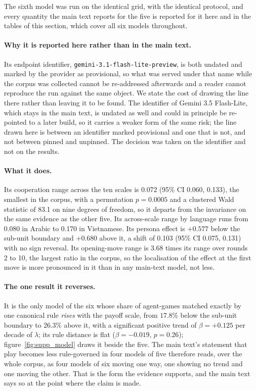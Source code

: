 \documentclass[openacc]{rsproca_new}
\newcommand{\lam}{\lambda}
\newcommand{\ci}[2]{(95\% CI #1, #2)}
\begin{document}
The sixth model was run on the identical grid, with the identical protocol, and
every quantity the main text reports for the five is reported for it here and
in the tables of this section, which cover all six models throughout.

\paragraph{Why it is reported here rather than in the main text.} Its endpoint
identifier, \texttt{gemini-3.1-flash-lite-preview}, is both undated and marked
by the provider as provisional, so what was served under that name while the
corpus was collected cannot be re-addressed afterwards and a reader cannot
reproduce the run against the same object. We state the cost of drawing the
line there rather than leaving it to be found. The identifier of Gemini 3.5
Flash-Lite, which stays in the main text, is undated as well and could in
principle be re-pointed to a later build, so it carries a weaker form of the
same risk; the line drawn here is between an identifier marked provisional and
one that is not, and not between pinned and unpinned. The decision was taken on
the identifier and not on the results.

\paragraph{What it does.} Its cooperation range across the ten scales is 0.072
\ci{0.060}{0.133}, the smallest in the corpus, with a permutation $p = 0.0005$
and a clustered Wald statistic of 83.1 on nine degrees of freedom, so it
departs from the invariance on the same evidence as the other five. Its
across-scale range by language runs from 0.080 in Arabic to 0.170 in
Vietnamese. Its persona effect is $+0.577$ below the sub-unit boundary and
$+0.680$ above it, a shift of 0.103 \ci{0.075}{0.131} with no sign reversal.
Its opening-move range is 3.68 times its range over rounds 2 to 10, the largest
ratio in the corpus, so the localisation of the effect at the first move is
more pronounced in it than in any main-text model, not less.

\paragraph{The one result it reverses.} It is the only model of the six whose
share of agent-games matched exactly by one canonical rule \emph{rises} with
the payoff scale, from $17.8\%$ below the sub-unit boundary to $26.3\%$ above
it, with a significant positive trend of $\beta = +0.125$ per decade of $\lam$;
its rule distance is flat ($\beta = -0.019$, $p = 0.26$);
figure~\ref{fig:supp_model} draws it beside the five. The main text's
statement that play becomes less rule-governed in four models of five therefore
reads, over the whole corpus, as four models of six moving one way, one showing
no trend and one moving the other. That is the form the evidence supports, and
the main text says so at the point where the claim is made.
\end{document}
